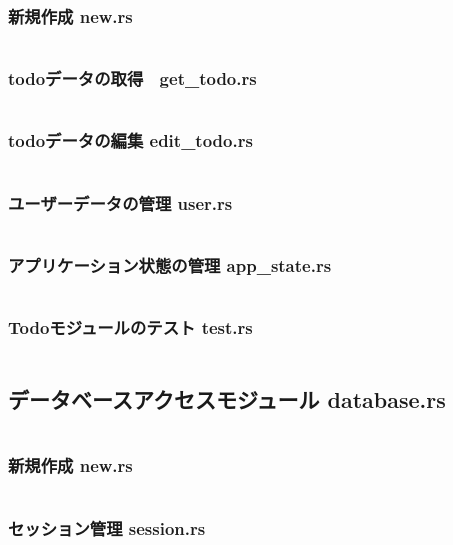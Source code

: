 \documentclass[paper=a4paper, fontsize=10pt, head_space=10mm, foot_space=17mm, gutter=17mm, line_length=185mm, twoside]{jlreq}
\begin{document}
\subsubsection{新規作成 new.rs}
\inputminted[linenos, breaklines]{rust}{src-rs/todo/new.rs}
\clearpage

\subsubsection{todoデータの取得　get\_todo.rs}
\inputminted[linenos, breaklines]{rust}{src-rs/todo/get_todo.rs}
\clearpage

\subsubsection{todoデータの編集 edit\_todo.rs}
\inputminted[linenos, breaklines]{rust}{src-rs/todo/edit_todo.rs}
\clearpage

\subsubsection{ユーザーデータの管理 user.rs}
\inputminted[linenos, breaklines]{rust}{src-rs/todo/user.rs}
\clearpage

\subsubsection{アプリケーション状態の管理 app\_state.rs}
\inputminted[linenos, breaklines]{rust}{src-rs/todo/app_state.rs}
\clearpage

\subsubsection{Todoモジュールのテスト test.rs}
\inputminted[linenos, breaklines]{rust}{src-rs/todo/test.rs}
\clearpage

\subsection{データベースアクセスモジュール database.rs}
\inputminted[linenos, breaklines]{rust}{src-rs/database.rs}
\clearpage

\subsubsection{新規作成 new.rs}
\inputminted[linenos, breaklines]{rust}{src-rs/database/new.rs}
\clearpage

\subsubsection{セッション管理 session.rs}
\inputminted[linenos, breaklines]{rust}{src-rs/database/session.rs}
\clearpage
\end{document}
